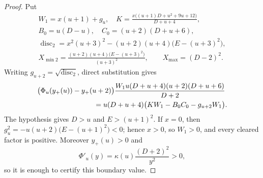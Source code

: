 \documentclass[twoside,10pt]{article}
\numberwithin{equation}{section}
\theoremstyle{slbody}
\theoremstyle{definition}
\theoremstyle{remark}
\numberwithin{theorem}{section}
\DeclareMathOperator{\disc}{disc}
\begin{document}
\begin{proof}
Put
\[
\begin{gathered}
 W_1=x(u+1)+g_u,\quad
 K=\frac{x\bigl((u+1)D+u^2+9u+12\bigr)}{D+u+4},\\
 B_0=u(D-u),\quad C_0=(u+2)(D+u+6),\\
 \disc_2=x^2(u+3)^2-(u+2)(u+4)\bigl(E-(u+3)^2\bigr),\\
 X_{\min2}=\frac{(u+2)(u+4)\bigl(E-(u+3)^2\bigr)}{(u+3)^2},
 \qquad X_{\max}=(D-2)^2.
\end{gathered}
\]
Writing $g_{u+2}=\sqrt{\disc_2}$, direct substitution gives
\begin{equation}\label{eq:cleared-transition}
\begin{split}
 &\bigl(\Phi_u(y_+(u))-y_+(u+2)\bigr)
 \frac{W_1u(D+u+4)(u+2)(D+u+6)}{D+2}\\
 &\hspace{28mm}
 =u(D+u+4)\bigl(KW_1-B_0C_0-g_{u+2}W_1\bigr).
\end{split}
\end{equation}
The hypothesis gives $D>u$ and $E>(u+1)^2$.  If $x=0$, then
$g_u^2=-u(u+2)\bigl(E-(u+1)^2\bigr)<0$; hence $x>0$, so $W_1>0$, and every
cleared factor is positive.  Moreover $y_+(u)>0$ and
\[
 \Phi'_u(y)=\kappa(u)\frac{(D+2)^2}{y^2}>0,
\]
so it is enough to certify this boundary value.


\end{proof}
\end{document}
